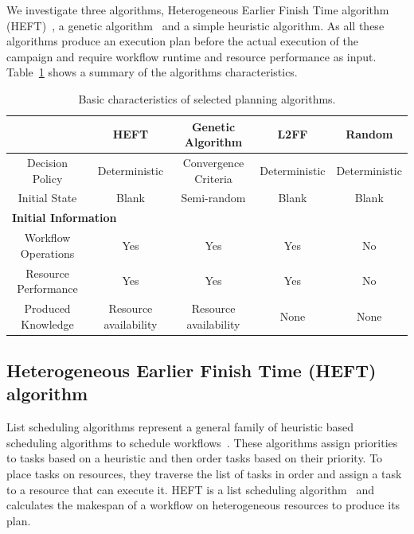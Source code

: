 We investigate three algorithms, Heterogeneous Earlier Finish Time algorithm 
(HEFT)~\cite{topcuoglu2002performance}, a genetic 
algorithm~\cite{page2005algorithm} and a simple heuristic algorithm. As all 
these algorithms produce an execution plan before the actual execution of the 
campaign and require workflow runtime and resource performance as input. 
Table~\ref{tab:sched_algo} shows a summary of the algorithms characteristics.

\begin{table}[t]
    \centering
    \scriptsize
    \begin{tabular}{@{}ccccc@{}}
        \toprule
        &\textbf{HEFT}     &\textbf{Genetic Algorithm} &\textbf{L2FF} & \textbf{Random} \\
        \midrule
        Decision Policy   &Deterministic &Convergence Criteria &Deterministic& Deterministic\\
        Initial State    &Blank &Semi-random &Blank & Blank\\
        \midrule
        \multicolumn{5}{l}{\textbf{Initial Information}}\\\midrule
        Workflow Operations &Yes & Yes & Yes & No\\
        Resource Performance &Yes &Yes &Yes & No\\
        \midrule
        Produced Knowledge& Resource availability& Resource availability&None&None\\
        \bottomrule
    \end{tabular}
    \caption{Basic characteristics of selected planning algorithms.\label{tab:sched_algo}}
\end{table}

\subsection{Heterogeneous Earlier Finish Time (HEFT) algorithm}
\label{algo:heft}
List scheduling algorithms represent a general family of heuristic based 
scheduling algorithms to schedule 
workflows~\cite{dong2006scheduling,list_sched_wiki}. These algorithms assign 
priorities to tasks based on a heuristic and then order tasks based on their 
priority. To place tasks on resources, they traverse the list of tasks in 
order and assign a task to a resource that can execute it. HEFT is a list 
scheduling algorithm~\cite{dong2006scheduling} and calculates the makespan of 
a workflow on heterogeneous resources to produce its plan.

